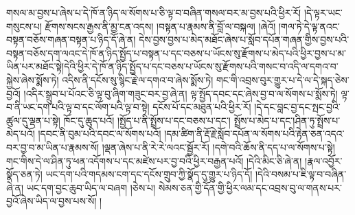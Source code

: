 གསལ་མ་བྱས་པ་ཞེས་པ་དེ་ཁོ་ན་ཉིད་ལ་སོགས་པ་ཅི་ལྟ་བ་བཞིན་གསལ་བར་མ་བྱས་པའི་ཕྱིར་རོ། །དེ་ལྟར་ཡང་གསུངས་པ། རྫོགས་སངས་རྒྱས་ནི་མྱ་ངན་འདས། །བསྟན་པ་རྣམས་ནི་བློ་ལ་བསྐལ། །ཞེའོ། །གལ་ཏེ་དེ་ལྟ་ནའང་བསྟན་བཅོས་གཞན་བསྟན་པ་ཉིད་དོ་ཞེ་ན། དེས་བྱས་བྱས་པ་མེད་མཐོང་ཞེས་པ་སློབ་དཔོན་གཞན་གྱིས་བྱས་པའི་བསྟན་བཅོས་དག་ལའང་དེ་ཁོ་ན་ཉིད་སྤྱོད་པ་བསྟན་པ་དང་བཅས་པ་ཡོངས་སུ་རྫོགས་པ་མེད་པའི་ཕྱིར་བྱས་པ་མ་ཡིན་པར་མཐོང་སྟེ།དེའི་ཕྱིར་དེ་ཁོ་ན་ཉིད་སྤྱོད་པ་དང་བཅས་པ་ཡོངས་སུ་རྫོགས་པའི་གསང་བ་འདི་ལ་དགའ་བ་སྐྱེས་ཞེས་སྨོས་ཏེ། འདིས་ནི་དངོས་སུ་སྙིང་རྗེ་ལ་དགའ་བ་ཞེས་སྨོས་ཏེ། གང་གི་འབྲས་བུར་གྱུར་པ་དེ་ལ་དེ་སྐད་ཅེས་བྱའོ། །འདིར་སྒྲུབ་པ་པོའང་ཅི་ལྟ་བུ་ཞིག་གཟུང་བར་བྱ་ཞེ་ན། ལྟ་སྤྱོད་དབང་དང་ཞེས་བྱ་བ་ལ་སོགས་པ་སྨོས་ཏེ། ལྟ་བ་ནི་ཡང་དག་པའི་ལྟ་བ་དང་ལོག་པའི་ལྟ་བ་སྟེ། དངོས་པོ་དང་མཐུན་པའི་ཕྱིར་རོ། །དེ་དང་བླང་བྱ་དང་སྤང་བྱའི་ཚུལ་དུ་ལྡན་པ་སྟེ། ཁོང་དུ་ཆུད་པའོ། །སྤྱོད་པ་ནི་སྤྲོས་པ་དང་བཅས་པ་དང་། སྤྲོས་པ་མེད་པ་དང་།ཤིན་ཏུ་སྤྲོས་པ་མེད་པའོ། །དབང་ནི་བུམ་པའི་དབང་ལ་སོགས་པའོ། །དམ་ཚིག་ནི་རྡོ་རྗེ་སློབ་དཔོན་ལ་སོགས་པའི་རྟེན་ཅན་འདའ་བར་བྱ་བ་མ་ཡིན་པ་རྣམས་སོ། །ལྡན་ཞེས་པ་ནི་རེ་རེ་ལའང་སྦྱོར་རོ། །དགེ་བའི་ཆོས་ནི་དད་པ་ལ་སོགས་པ་སྟེ། གང་གིས་དེ་ལ་ཤིན་​ ཏུ་ཕན་འདོགས་པ་དང་མཛེས་པར་བྱ་བའི་ཕྱིར་བརྒྱན་པའོ། །དེའི་མིང་ཅི་ཞེ་ན། །རྣལ་འབྱོར་སྣོད་ཅན་ཏེ། ཡང་དག་པའི་གདམས་ངག་དང་དངོས་གྲུབ་ཀྱི་སྣོད་དུ་གྱུར་པ་ཉིད་དོ། །དེའི་བསམ་པ་ཇི་ལྟ་བ་བཞིན་ཞེ་ན། ཡང་དག་བྱང་ཆུབ་ཡིད་ལ་བཞག །ཅེས་པ། སེམས་ཅན་གྱི་དོན་གྱི་ཕྱིར་ལམ་དང་འབྲས་བུ་ལ་གནས་པར་བྱའོ་ཞེས་ཡིད་ལ་བྱས་པས་སོ། །

